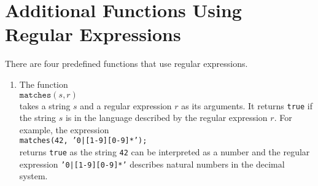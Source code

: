 \section{Additional Functions Using Regular Expressions}
There are four predefined functions that use regular expressions.
\begin{enumerate}
\item The function 
      \\[0.2cm]
      \hspace*{1.3cm}
      $\mathtt{matches}(s, r)$ 
      \\[0.2cm]
      takes a string $s$ and a regular expression $r$ as its arguments.  It returns
      \texttt{true} if the string $s$ is in the language described by the regular
      expression $r$.  For example, the expression
      \\[0.2cm]
      \hspace*{1.3cm}
      \texttt{matches(42, '0|[1-9][0-9]*');}
      \\[0.2cm]
      returns \texttt{true} as the string \texttt{42} can be
      interpreted as a number and the regular expression \texttt{'0|[1-9][0-9]*'}
      describes natural numbers in the decimal system.


\end{enumerate}
